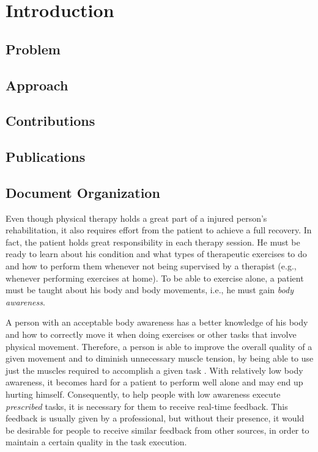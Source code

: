 \chapter{Introduction}
\label{sec:intro}

\section{Problem}

\section{Approach}

\section{Contributions}

\section{Publications}

\section{Document Organization}














Even though physical therapy holds a great part of a injured person's rehabilitation, 
it also requires effort from the patient to achieve a full recovery.
In fact, the patient holds great responsibility in each therapy session.
He must be ready to learn about his condition and what types of therapeutic exercises 
to do and how to perform them whenever not being supervised by a therapist (e.g., whenever performing exercises at home).
To be able to exercise alone, a patient must be taught about his body and body 
movements, i.e., he must gain \emph{body awareness}.

A person with an acceptable body awareness has a better knowledge of his body and how to correctly move it when doing exercises or other tasks that involve physical movement.
Therefore, a person is able to improve the overall quality of a given movement and to diminish unnecessary muscle tension, 
by being able to use just the muscles required to accomplish a given task \cite{Singh2014a}.
With relatively low body awareness, it becomes hard for a patient to perform well alone and may 
end up hurting himself. %
Consequently, to help people with low awareness 
execute \textit{prescribed} tasks, it is necessary for them to receive real-time feedback.
This feedback is usually given by a professional, 
but without their presence, it would be desirable for people to receive similar feedback from other sources, in order to maintain a certain quality in the task execution.

